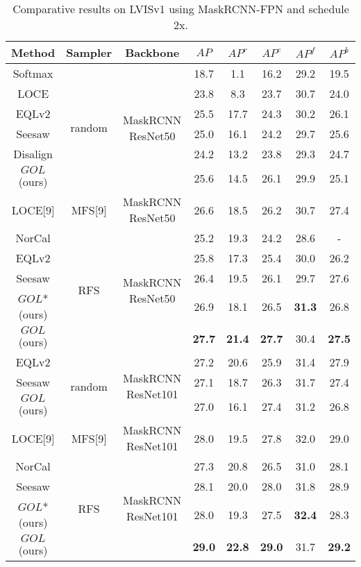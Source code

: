 \documentclass[runningheads]{llncs}
\begin{document}
\begin{table}
    \centering
    \caption{Comparative results on LVISv1 using MaskRCNN-FPN and schedule 2x.}
    \begin{tabular}{c|c|c|c|c|c|c|c}
         Method&Sampler&Backbone & $AP$&$AP^r$&$AP^c$&$AP^f$&$AP^b$ \\
         \hline
         Softmax&\multirow{6}{*}{random}&\multirow{6}{*}{MaskRCNN ResNet50}&18.7&1.1&16.2&29.2&19.5\\
         LOCE\cite{feng2021exploring}&&&23.8 &8.3 &23.7&30.7&24.0\\
         EQLv2\cite{tan2021equalization}&& &25.5&17.7&24.3&30.2&26.1\\
         Seesaw\cite{wang2021seesaw}&& &25.0 &16.1 &24.2&29.7&25.6\\
         Disalign\cite{zhang2021distribution}&&&24.2&13.2&23.8&29.3&24.7\\
         $GOL$ (ours)&&&25.6&14.5&26.1&29.9&25.1\\
         \hline
          LOCE[9]&MFS[9]&MaskRCNN ResNet50 &26.6 &18.5 &26.2&30.7&27.4\\
         \hline
         NorCal\cite{pan2021model}&\multirow{5}{*}{RFS}&\multirow{5}{*}{MaskRCNN ResNet50}&25.2&19.3&24.2&28.6&-\\
         EQLv2\cite{tan2021equalization}&&&25.8 &17.3 &25.4&30.0&26.2\\
         Seesaw\cite{wang2021seesaw}&&&26.4 &19.5&26.1&29.7&27.6\\
         $GOL$* (ours)& &&26.9&18.1&26.5&\textbf{31.3}&26.8\\
         $GOL$ (ours)&& &\textbf{27.7}&\textbf{21.4}&\textbf{27.7}&30.4&\textbf{27.5}\\
         \hline
         EQLv2\cite{tan2021equalization}&\multirow{3}{*}{random}&\multirow{3}{*}{MaskRCNN ResNet101}&27.2&20.6&25.9&31.4&27.9\\
         Seesaw\cite{wang2021seesaw}&&&27.1&18.7&26.3&31.7&27.4\\
         $GOL$ (ours)&&&27.0&16.1&27.4&31.2&26.8\\
         \hline
         LOCE[9]&MFS[9]&MaskRCNN ResNet101&28.0 &19.5 &27.8&32.0&29.0\\
         \hline
         NorCal\cite{pan2021model}&\multirow{4}{*}{RFS}&\multirow{4}{*}{MaskRCNN ResNet101}&27.3&20.8&26.5&31.0&28.1\\
         Seesaw\cite{wang2021seesaw}&&&28.1&20.0&28.0&31.8&28.9\\
         $GOL$*(ours)&&&28.0&19.3&27.5&\textbf{32.4}&28.3\\
         $GOL$(ours)&&&\textbf{29.0}&\textbf{22.8}&\textbf{29.0}&31.7&\textbf{29.2}\\
         
    \end{tabular}
    \label{tab:deep_models}
\end{table}
\end{document}
